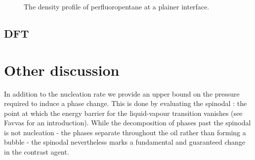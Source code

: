 \begin{figure}
 \centering
  
  \caption{ The density profile of perfluoropentane at a plainer interface.
  }
 \label{fig:profile}
\end{figure}







\subsection{DFT}
\section{Other discussion}

In addition to the nucleation rate we provide an upper bound on the pressure required to induce a phase change.
This is done by evaluating the spinodal : the point at which the energy barrier for the liquid-vapour transition vanishes (see Favvas\cite{Favvas2008} for an introduction).
While the decomposition of phases past the spinodal is not  nucleation -
the phases separate throughout the oil rather than forming a bubble -
the spinodal nevertheless marks a fundamental and guaranteed  change in the contrast agent.


